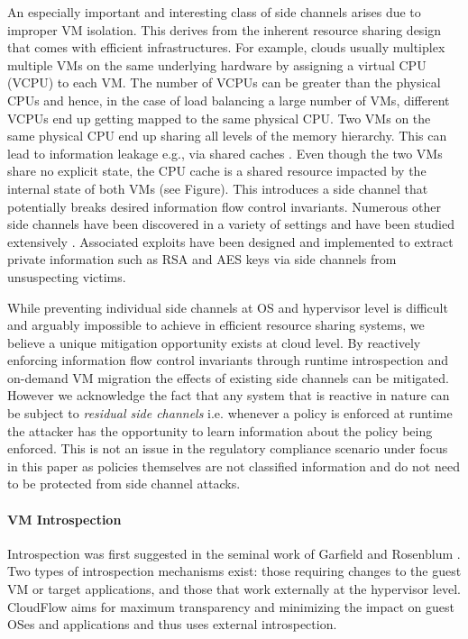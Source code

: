 An especially important and interesting class of side channels arises due to
improper VM isolation.  This derives from the inherent resource sharing
design that comes with efficient infrastructures.  For example, clouds
usually multiplex multiple VMs on the same underlying hardware by assigning
a virtual CPU (VCPU) to each VM.  The number of VCPUs can be greater than
the physical CPUs and hence, in the case of load balancing a large number of
VMs, different VCPUs end up getting mapped to the same physical CPU.  Two
VMs on the same physical CPU end up sharing all levels of the memory
hierarchy.  This can lead to information leakage e.g.,  via shared caches
\cite{SideCloud,SideCrypto}.  Even though the two VMs share no explicit
state, the CPU cache is a shared resource impacted by the internal state of
both VMs (see Figure).  This
introduces a side channel that potentially breaks desired information flow
control invariants.  Numerous other side channels have been discovered in a
variety of settings and have been studied extensively
\cite{SideCloud,SideCrypto,LastSummer,ScriptlessAttacks}.  Associated
exploits have been designed and implemented to extract private information
such as RSA and AES keys \cite{SideCloud,SideCrypto,PrimeProbe12} via side channels from
unsuspecting victims.

While preventing individual side channels at OS and hypervisor level is
difficult and arguably impossible to achieve in efficient resource sharing
systems, we believe a unique mitigation opportunity exists at cloud level. 
By reactively enforcing information flow control invariants through runtime
introspection and on-demand VM migration the effects of existing side channels can be mitigated.
However we acknowledge the fact that any system that is reactive in nature can be subject to 
{\em residual side channels} i.e. whenever a policy is enforced at runtime the attacker has the opportunity 
to learn information about the policy being enforced. This is not an issue in the regulatory compliance scenario 
under focus in this paper as policies themselves are not classified information and do not need to be protected from side channel attacks.

\paragraph{\bf VM Introspection}

Introspection was
first suggested in the seminal work of Garfield and Rosenblum \cite{Terra}. 
Two types of introspection mechanisms exist: those requiring changes to the
guest VM or target applications, and those that work externally at the hypervisor level.  CloudFlow aims for maximum
transparency and minimizing the impact on guest OSes and applications and
thus uses external introspection.

